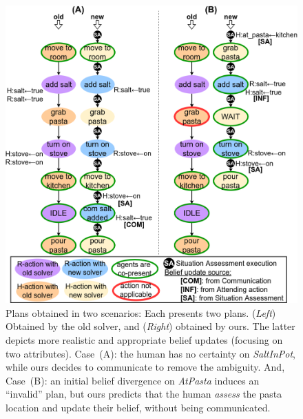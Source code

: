 \documentclass[letterpaper]{article} %
\begin{document}
\begin{figure}[t!]
    \centering
    \includegraphics[width=0.99\linewidth]{figures/bc_plans.png}
    \caption{
    Plans obtained in two scenarios: Each presents two plans. (\textit{Left}) Obtained by the old solver, and (\textit{Right}) obtained by ours. The latter depicts more realistic and appropriate belief updates (focusing on two attributes).
    Case~(A): the human has no certainty on {\em SaltInPot}, while ours decides to communicate to remove the ambiguity. 
    And, Case~(B): an initial belief divergence on {\em AtPasta} induces an ``invalid'' plan, but ours predicts that the human \textit{assess} the pasta location and update their belief, without being communicated.
    }
    \label{fig:scenarios}
\end{figure}




% 

\end{document}
